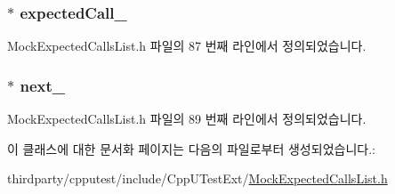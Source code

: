 \subsubsection[{\texorpdfstring{expected\+Call\+\_\+}{expectedCall_}}]{$\ast$ expected\+Call\+\_\+}\hypertarget{class_mock_expected_calls_list_1_1_mock_expected_calls_list_node_a840e02d52408beb09a8225d63a115d98}{}\label{class_mock_expected_calls_list_1_1_mock_expected_calls_list_node_a840e02d52408beb09a8225d63a115d98}


Mock\+Expected\+Calls\+List.\+h 파일의 87 번째 라인에서 정의되었습니다.

\subsubsection[{\texorpdfstring{next\+\_\+}{next_}}]{$\ast$ next\+\_\+}\hypertarget{class_mock_expected_calls_list_1_1_mock_expected_calls_list_node_aaae452a372ae14c06a6d5d252df73725}{}\label{class_mock_expected_calls_list_1_1_mock_expected_calls_list_node_aaae452a372ae14c06a6d5d252df73725}


Mock\+Expected\+Calls\+List.\+h 파일의 89 번째 라인에서 정의되었습니다.



이 클래스에 대한 문서화 페이지는 다음의 파일로부터 생성되었습니다.\+:\begin{DoxyCompactItemize}
\item 
thirdparty/cpputest/include/\+Cpp\+U\+Test\+Ext/\hyperlink{_mock_expected_calls_list_8h}{Mock\+Expected\+Calls\+List.\+h}\end{DoxyCompactItemize}
